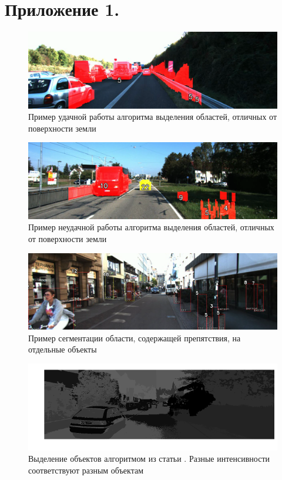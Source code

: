 \documentclass[aps,%
14pt,%
final,%
oneside,
onecolumn,%
musixtex, %
superscriptaddress,%
centertags]{extarticle} %
\begin{document}
\section{Приложение 1.}
\begin{figure}[h]
     \includegraphics[width=\textwidth]{basic_vdisparity_good.png}
     \caption{Пример удачной работы алгоритма выделения областей, отличных от поверхности земли }
     \label{fig:basic_vdisparity_good}
\end{figure}
\begin{figure}[]
     \includegraphics[width=\textwidth]{basic_vdisparity.png}
     \caption{Пример неудачной работы алгоритма выделения областей, отличных от поверхности земли }
     \label{fig:basic_vdisparity}
\end{figure}
\begin{figure}[]
     \includegraphics[width=\textwidth]{stixel_boxes.png}
     \caption{Пример сегментации области, содержащей препятствия, на отдельные объекты }
     \label{fig:stixel_boxes}
\end{figure}
\begin{figure}[]
     \includegraphics[width=\textwidth]{download.png}
     \caption{Выделение объектов алгоритмом из статьи \cite{franke20056d}. Разные интенсивности соответствуют разным объектам}
     \label{fig:6d}
\end{figure}
\end{document}

